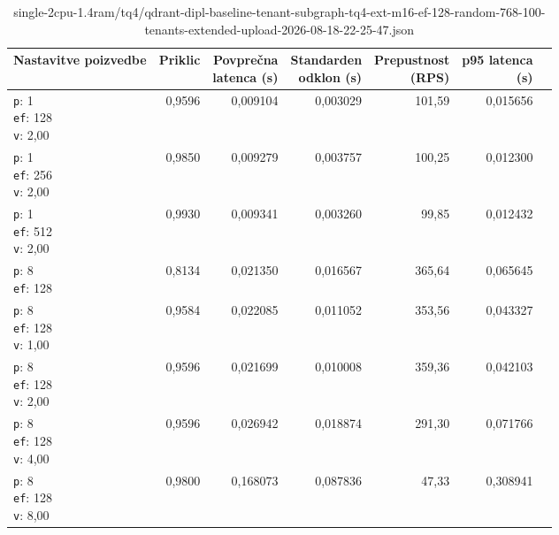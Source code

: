 \begin{table}[htbp]
  \centering
\small
  \caption{single-2cpu-1.4ram/tq4/qdrant-dipl-baseline-tenant-subgraph-tq4-ext-m16-ef-128-random-768-100-tenants-extended-upload-2026-08-18-22-25-47.json}
  \label{tab:single-2cpu-1.4ram:tq4:qdrant-dipl-baseline-tenant-subgraph-tq4-ext-m16-ef-128-random-768-100-tenants-extended-upload-2026-08-18-22-25-47.json}
  \begin{tabularx}{\textwidth}{Xrrrrrr}
    \toprule
    Nastavitve poizvedbe & Priklic & \makecell{Povprečna\\latenca (s)} & \makecell{Standarden\\odklon (s)} & \makecell{Prepustnost\\(RPS)} & \makecell{p95 latenca\\(s)}  \\
    \midrule
    \makecell{\texttt{p}: 1\\\texttt{ef}: 128\\\texttt{v}: 2,00} & 0,9596 & 0,009104 & 0,003029 & 101,59 & 0,015656 \\
    \makecell{\texttt{p}: 1\\\texttt{ef}: 256\\\texttt{v}: 2,00} & 0,9850 & 0,009279 & 0,003757 & 100,25 & 0,012300 \\
    \makecell{\texttt{p}: 1\\\texttt{ef}: 512\\\texttt{v}: 2,00} & 0,9930 & 0,009341 & 0,003260 & 99,85 & 0,012432 \\
    \makecell{\texttt{p}: 8\\\texttt{ef}: 128} & 0,8134 & 0,021350 & 0,016567 & 365,64 & 0,065645 \\
    \makecell{\texttt{p}: 8\\\texttt{ef}: 128\\\texttt{v}: 1,00} & 0,9584 & 0,022085 & 0,011052 & 353,56 & 0,043327 \\
    \makecell{\texttt{p}: 8\\\texttt{ef}: 128\\\texttt{v}: 2,00} & 0,9596 & 0,021699 & 0,010008 & 359,36 & 0,042103 \\
    \makecell{\texttt{p}: 8\\\texttt{ef}: 128\\\texttt{v}: 4,00} & 0,9596 & 0,026942 & 0,018874 & 291,30 & 0,071766 \\
    \makecell{\texttt{p}: 8\\\texttt{ef}: 128\\\texttt{v}: 8,00} & 0,9800 & 0,168073 & 0,087836 & 47,33 & 0,308941 \\

\end{tabularx}
\end{table}
